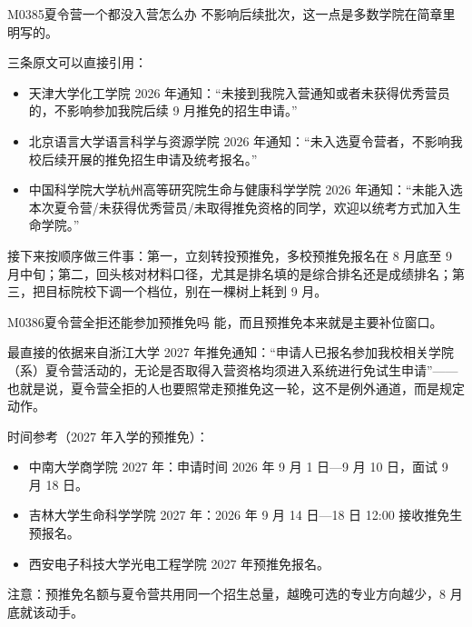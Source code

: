\begin{qa}{M0385}{夏令营一个都没入营怎么办}
不影响后续批次，这一点是多数学院在简章里明写的。

三条原文可以直接引用：
\begin{itemize}
  \item 天津大学化工学院 2026 年通知：“未接到我院入营通知或者未获得优秀营员的，不影响参加我院后续 9 月推免的招生申请。”
  \item 北京语言大学语言科学与资源学院 2026 年通知：“未入选夏令营者，不影响我校后续开展的推免招生申请及统考报名。”
  \item 中国科学院大学杭州高等研究院生命与健康科学学院 2026 年通知：“未能入选本次夏令营/未获得优秀营员/未取得推免资格的同学，欢迎以统考方式加入生命学院。”
\end{itemize}

接下来按顺序做三件事：第一，立刻转投预推免，多校预推免报名在 8 月底至 9 月中旬；第二，回头核对材料口径，尤其是排名填的是综合排名还是成绩排名；第三，把目标院校下调一个档位，别在一棵树上耗到 9 月。
\end{qa}

\begin{qa}{M0386}{夏令营全拒还能参加预推免吗}
能，而且预推免本来就是主要补位窗口。

最直接的依据来自浙江大学 2027 年推免通知：“申请人已报名参加我校相关学院（系）夏令营活动的，无论是否取得入营资格均须进入系统进行免试生申请”——也就是说，夏令营全拒的人也要照常走预推免这一轮，这不是例外通道，而是规定动作。

时间参考（2027 年入学的预推免）：
\begin{itemize}
  \item 中南大学商学院 2027 年：申请时间 2026 年 9 月 1 日—9 月 10 日，面试 9 月 18 日。
  \item 吉林大学生命科学学院 2027 年：2026 年 9 月 14 日—18 日 12:00 接收推免生预报名。
  \item 西安电子科技大学光电工程学院 2027 年预推免报名。
\end{itemize}

注意：预推免名额与夏令营共用同一个招生总量，越晚可选的专业方向越少，8 月底就该动手。
\end{qa}

